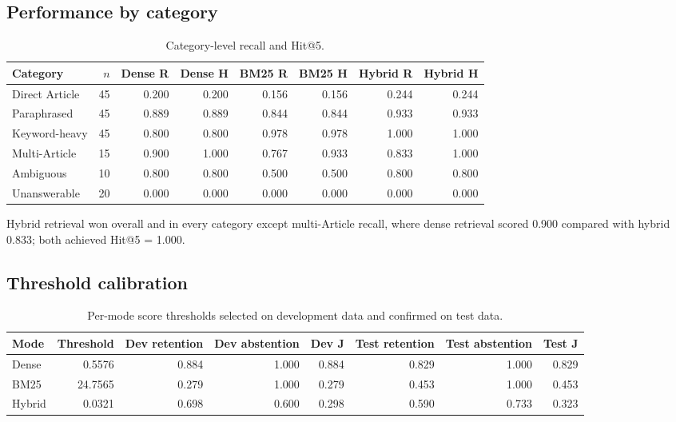 \documentclass[11pt]{article}
\begin{document}
\subsection{Performance by category}

\begin{table}[H]
\centering
\caption{Category-level recall and Hit@5.}
\label{tab:category-results}
\begin{tabular}{lrrrrrrr}
\toprule
Category & $n$ & Dense R & Dense H & BM25 R & BM25 H & Hybrid R & Hybrid H \\
\midrule
Direct Article & 45 & 0.200 & 0.200 & 0.156 & 0.156 & 0.244 & 0.244 \\
Paraphrased & 45 & 0.889 & 0.889 & 0.844 & 0.844 & 0.933 & 0.933 \\
Keyword-heavy & 45 & 0.800 & 0.800 & 0.978 & 0.978 & 1.000 & 1.000 \\
Multi-Article & 15 & 0.900 & 1.000 & 0.767 & 0.933 & 0.833 & 1.000 \\
Ambiguous & 10 & 0.800 & 0.800 & 0.500 & 0.500 & 0.800 & 0.800 \\
Unanswerable & 20 & 0.000 & 0.000 & 0.000 & 0.000 & 0.000 & 0.000 \\
\bottomrule
\end{tabular}
\end{table}

Hybrid retrieval won overall and in every category except multi-Article recall, where dense retrieval scored 0.900 compared with hybrid 0.833; both achieved Hit@5 = 1.000.

\subsection{Threshold calibration}

\begin{table}[H]
\centering
\caption{Per-mode score thresholds selected on development data and confirmed on test data.}
\label{tab:threshold}
\begin{tabular}{lrrrrrrr}
\toprule
Mode & Threshold & Dev retention & Dev abstention & Dev J & Test retention & Test abstention & Test J \\
\midrule
Dense & 0.5576 & 0.884 & 1.000 & 0.884 & 0.829 & 1.000 & 0.829 \\
BM25 & 24.7565 & 0.279 & 1.000 & 0.279 & 0.453 & 1.000 & 0.453 \\
Hybrid & 0.0321 & 0.698 & 0.600 & 0.298 & 0.590 & 0.733 & 0.323 \\
\bottomrule
\end{tabular}
\end{table}
\end{document}
